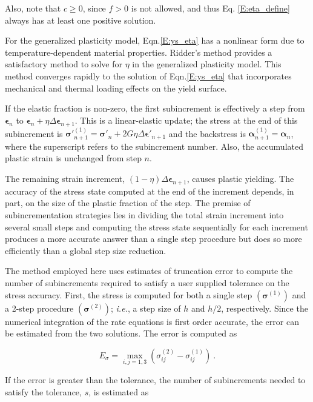 \documentclass[11pt]{report}
\numberwithin{equation}{section}
\newcommand{\bmf } {\boldsymbol }
\begin{document}
Also, note that $c \ge 0$, since $f >0$ is not allowed, and 
thus Eq. \eqref{E:eta_define}
always has at least one positive solution.

For the generalized plasticity model,  Eqn.\;\eqref{E:ys_eta} has a nonlinear form
due to temperature-dependent material properties. Ridder's method
provides a satisfactory method to solve
for $\eta$ in the generalized plasticity model. This method converges rapidly 
to the solution of Eqn.\;\eqref{E:ys_eta} that incorporates mechanical and thermal 
loading effects on the yield surface. 

If the elastic fraction is non-zero, the first subincrement is 
effectively a step from $\bmf \epsilon_n$ to $\bmf \epsilon_n +
\eta \Delta \bmf \epsilon_{n+1}$. This is a linear-elastic update; the stress 
at the end of this subincrement is $\bmf \sigma'^{(1)}_{n+1} = \bmf \sigma'_n + 2G \eta \Delta \bmf
\epsilon'_{n+1}$ and the backstress is $\bmf \alpha^{(1)}_{n+1} = \bmf \alpha_n$,
where the superscript refers to the subincrement number. 
Also, the accumulated plastic strain is unchanged from step $n$.

The remaining strain increment, $\left ( 1 - \eta \right )
\Delta \bmf \epsilon_{n+1}$, causes plastic yielding. The 
accuracy of the stress state computed at the end of the increment 
depends, in part, on the size of the plastic fraction of the step.  The premise 
of subincrementation strategies lies in dividing the total strain 
increment into several small steps and computing the stress state 
sequentially for each increment produces a more accurate answer than 
a single step procedure but does so more efficiently than a global 
step size reduction. 

The method employed here uses estimates of truncation error to compute the 
number of subincrements required to satisfy a user supplied 
tolerance on the stress accuracy. First, the stress is computed for 
both a single step $( \bmf \sigma^{(1)})$ and a 2-step 
procedure $( \bmf \sigma^{(2)})$; \textit{i.e.}, a step size 
of $h$ and $h/2$, respectively. Since the numerical integration of the rate 
equations is first order accurate, the error can be estimated from 
the two solutions.  The error is computed as

\begin{equation}
{E_\sigma } = \mathop {\max }\limits_{i,j = 1,3} 
\left( {\sigma _{ij}^{(2)} - \sigma _{ij}^{(1)}} \right)~.
\end{equation}

If the error is greater than the tolerance, the number of subincrements 
needed to satisfy the tolerance, $s$, is estimated as
\end{document}
